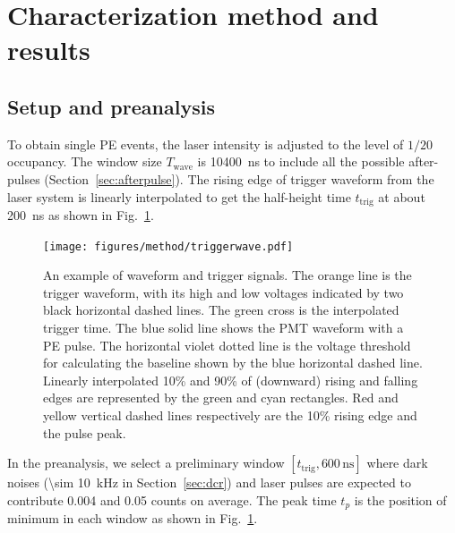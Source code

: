 \section{Characterization method and results}
\label{Method}
\subsection{Setup and preanalysis}
\label{sec:laserstage}

To obtain single PE events, the laser intensity is adjusted to the level of $1/20$ occupancy. The window size $T_{\mathrm{wave}}$ is \SI{10400}{ns} to include all the possible after-pulses (Section~\ref{sec:afterpulse}). The rising edge of trigger waveform from the laser system is linearly interpolated to get the half-height time $t_{\mathrm{trig}}$ at about \SI{200}{ns} as shown in Fig.~\ref{fig:triggertime}.
\begin{figure}[!htbp]
    \centering
    \texttt{[image: figures/method/triggerwave.pdf]}
    \caption{An example of waveform and trigger signals. The orange line is the trigger waveform, with its high and low voltages indicated by two black horizontal dashed lines. The green cross is the interpolated trigger time. The blue solid line shows the PMT waveform with a PE pulse. The horizontal violet dotted line is the voltage threshold for calculating the baseline shown by the blue horizontal dashed line. Linearly interpolated 10\% and 90\% of (downward) rising and falling edges are represented by the green and cyan rectangles. Red and yellow vertical dashed lines respectively are the 10\% rising edge and the pulse peak.}
    \label{fig:triggertime}
\end{figure}


In the preanalysis, we select a preliminary window $[t_{\mathrm{trig}},600\,\mathrm{ns}]$ where dark noises (\SI{\sim 10}{kHz} in Section~\ref{sec:dcr}) and laser pulses are expected to contribute 0.004 and 0.05 counts on average. The peak time $t_p$ is the position of minimum in each window as shown in Fig.~\ref{fig:triggertime}.




